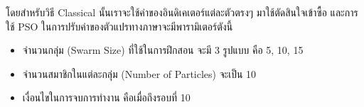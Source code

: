 \begin{table}[ht]
    \centering
    \caption{ตัวชี้วัดที่นำมาใช้ในการเข้าซื้อ}
    \label{tab:indicators}
\end{table}
โดยสำหรับวิธี Classical นั้นเราจะใช้ค่าของอินดิเคเตอร์แต่ละตัวตรงๆ มาใช้ตัดสินใจเข้าซื้อ และการใช้ PSO ในการปรับค่าของตัวแปรทางภาษาจะมีพารามิเตอร์ตังนี้
\begin{itemize}
    \item {จำนวนกลุ่ม (Swarm Size) ที่ใช้ในการฝึกสอน จะมี 3 รูปแบบ คือ 5, 10, 15}
    \item {จำนวนสมาชิกในแต่ละกลุ่ม (Number of Particles) จะเป็น 10}
    \item {เงื่อนไขในการจบการทำงาน คือเมื่อถึงรอบที่ 10}
\end{itemize}
